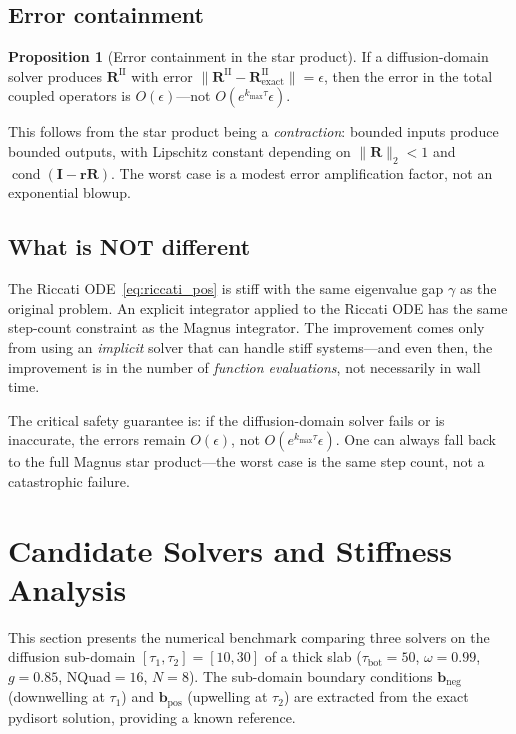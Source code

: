 \documentclass[11pt,a4paper]{article}
\newcommand{\cond}{\operatorname{cond}}
\newcommand{\vect}[1]{\bm{#1}}
\newcommand{\mat}[1]{\mathbf{#1}}
\newcommand{\tbot}{\tau_{\mathrm{bot}}}
\newcommand{\kmax}{k_{\max}}
\theoremstyle{definition}
\newtheorem{proposition}{Proposition}
\begin{document}
\subsection{Error containment}

\begin{proposition}[Error containment in the star product]
If a diffusion-domain solver produces $\mat{R}^{\mathrm{II}}$ with
error $\|\mat{R}^{\mathrm{II}}-\mat{R}^{\mathrm{II}}_{\text{exact}}\|
= \epsilon$, then the error in the total coupled operators is
$O(\epsilon)$---not $O(e^{\kmax\tau}\epsilon)$.
\end{proposition}

This follows from the star product being a \emph{contraction}:
bounded inputs produce bounded outputs, with Lipschitz constant
depending on $\|\mat{R}\|_2<1$ and $\cond(\mat{I}-\mat{r}\mat{R})$.
The worst case is a modest error amplification factor, not an
exponential blowup.

\subsection{What is NOT different}

The Riccati ODE~\eqref{eq:riccati_pos} is stiff with the same
eigenvalue gap $\gamma$ as the original problem.  An explicit
integrator applied to the Riccati ODE has the same step-count
constraint as the Magnus integrator.  The improvement comes only
from using an \emph{implicit} solver that can handle stiff
systems---and even then, the improvement is in the number of
\emph{function evaluations}, not necessarily in wall time.

The critical safety guarantee is: if the diffusion-domain solver
fails or is inaccurate, the errors remain $O(\epsilon)$, not
$O(e^{\kmax\tau}\epsilon)$.  One can always fall back to the full
Magnus star product---the worst case is the same step count, not
a catastrophic failure.


\section{Candidate Solvers and Stiffness Analysis}\label{sec:solvers}

This section presents the numerical benchmark comparing three solvers
on the diffusion sub-domain $[\tau_1,\tau_2]=[10,30]$ of a thick slab
($\tbot=50$, $\omega=0.99$, $g=0.85$, NQuad${}=16$, $N=8$).  The
sub-domain boundary conditions $\vect{b}_{\text{neg}}$ (downwelling
at $\tau_1$) and $\vect{b}_{\text{pos}}$ (upwelling at $\tau_2$) are
extracted from the exact pydisort solution, providing a known reference.
\end{document}
